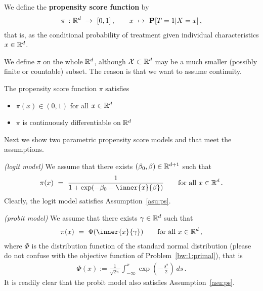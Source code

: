 \begin{definition}
  We define the \textbf{propensity score function} by
  \begin{gather*}
    \pi
    \ 
    \colon
    \R^d
    \ 
    \to
    \ 
    [0,1]
    \,,
    \qquad
    x
    \ 
    \mapsto
    \ 
    \P
    [
    T=1
    |
    X=x
    ]
    \,,
  \end{gather*}
  that is, 
  as the conditional probability of treatment given individual characteristics $x\in\mathbb{R}^d$.
\end{definition}
\begin{remark}
  We define $\pi$ on the whole $\mathbb{R}^d$, although $\mathcal{X}\subset \mathbb{R}^d$ may be a much smaller (possibly finite or countable) subset.
  The reason is that we want to assume continuity.
\end{remark}
\begin{assumption}
  \label{asu:ps}
  The propensity score function $\pi$ satisfies
  \begin{itemize}
    \item
      $\pi(x)\in (0,1)$ for all $x\in\mathbb{R}^d$
    \item
      $\pi$ is continuously differentiable on $\mathbb{R}^d$
  \end{itemize}
\end{assumption}

Next we show two parametric propensity score models and that meet the assumptions.
\begin{example}
  \emph{(logit model)}
  We assume that there exists $(\beta_0,\beta)\in\mathbb{R}^{d+1}$ such that
  \begin{gather*}
    \pi(x)
    \ 
    =
    \ 
    \frac{1}
    {1
      +
      \exp(-\beta_0-\inner{x}{\beta})
    }
    \qquad
    \text{for all}
    \ 
    x\in\R^d
    \,.
  \end{gather*}
  Clearly, the logit model satisfies Assumption~\ref{asu:ps}.
\end{example}

\begin{example}
  \emph{(probit model)}
  We assume that there exists $\gamma\in\mathbb{R}^d$ such that
  \begin{gather*}
    \pi(x)
    \ 
    =
    \ 
    \Phi(\inner{x}{\gamma})
    \qquad
    \text{for all}
    \ 
    x\in\R^d
    \,,
  \end{gather*}
  where $\Phi$ is the distribution function of the standard normal 
  distribution (please do not confuse with the objective function of Problem~\ref{bw:1:primal}), that is
  \begin{gather*}
    \Phi(x)
    :=
    \frac{1}{\sqrt{2\pi}}
    \int_{-\infty}
    ^x
    \exp
    \left( 
      -\frac{s^2}{2}
    \right)
    \,
    ds
    \,.
  \end{gather*}
  It is readily clear that the probit model also satisfies Assumption~\ref{asu:ps}.
\end{example}

